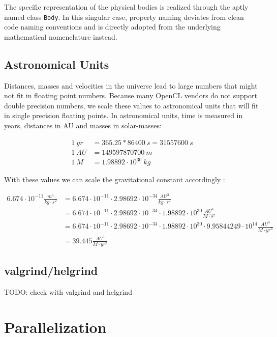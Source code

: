 \documentclass[a4paper,11pt]{scrartcl} %
\begin{document}
The specific representation of the physical bodies is realized through the aptly named class \texttt{Body}. In this singular case, property naming deviates from clean code naming conventions and is directly adopted from the underlying mathematical nomenclature instead.

\subsection{Astronomical Units}
Distances, masses and velocities in the universe lead to large numbers that might not fit in floating
point numbers. Because many OpenCL vendors do not support double precision numbers, we scale these values to astronomical units that will fit in single precision floating points. In astronomical units, time is
measured in years, distances in AU and masses in solar-masses:

\begin{align*}
	1~yr &= 365.25 * 86400~s = 31557600~s \\
	1~AU &= 149597870700~m \\
	1~M &=  1.98892 \cdot 10^{30}~kg
\end{align*}

With these values we can scale the gravitational constant accordingly \cite{astrounits}:

\begin{align*}
	6.674 \cdot 10^{-11} \frac{m^3}{kg \cdot s^2}
	& =  6.674 \cdot 10^{-11} \cdot 2.98692\cdot 10^{-34} \frac{AU^3}{kg \cdot s^2}\\
	& = 6.674 \cdot 10^{-11} \cdot 2.98692\cdot 10^{-34} \cdot 1.98892 \cdot 10^{30} \frac{AU^3}{M \cdot s^2} \\
	& = 6.674 \cdot 10^{-11} \cdot 2.98692\cdot 10^{-34} \cdot 1.98892 \cdot 10^{30} \cdot 9.95844249\cdot 10^{14} \frac{AU^3}{M \cdot yr^2}\\
	& = 39.445 \frac{AU^3}{M \cdot yr^2}
\end{align*}

\subsection{valgrind/helgrind}
TODO: check with valgrind and helgrind

\section{Parallelization}
\end{document}
